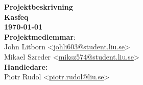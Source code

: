 \begin{titlepage}
   \begin{center}
      \textbf{\Huge Projektbeskrivning}\\[1cm]
      \textbf{\Large Kasfeq}\\[0.5cm]
      \textbf{\large \today}\\[1cm]
      
      \textbf{Projektmedlemmar}:\\
      John Litborn <\href{mailto:johli603@student.liu.se}{johli603@student.liu.se}>\\
      Mikael Szreder <\href{mailto:miksz574@student.liu.se}{miksz574@student.liu.se}>\\[0.5cm]

      \textbf{Handledare:}\\
      Piotr Rudol <\href{mailto:piotr.rudol@liu.se}{piotr.rudol@liu.se}>\\

   \end{center}
\end{titlepage}
